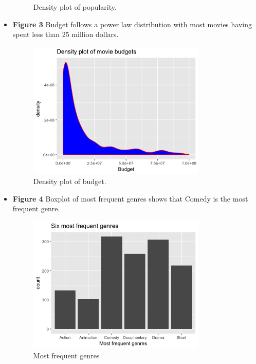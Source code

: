 \documentclass[a4paper]{article}
\begin{document}
\begin{itemize}
\begin{figure}[h]
\begin{center}
		\caption{Density plot of popularity.}
		\label{fig:f2}
		\end{center}
		\end{figure}
		\item \textbf{Figure 3} Budget follows a power law distribution with most movies having spent less than 25 million dollars.
		\begin{figure}[h]
		\begin{center}
		\includegraphics[width=0.8\textwidth]{fig_3_density_budget}
		\caption{Density plot of budget.}
		\label{fig:f3}
		\end{center}
		\end{figure}
		\item \textbf{Figure 4}
		Boxplot of most frequent genres shows that Comedy is the most frequent genre.
		\begin{figure}[h]
		\begin{center}
		\includegraphics[width=0.8\textwidth]{fig_4_boxplot_genres}
		\caption{Most frequent genres}
		\label{fig:f4}
		\end{center}
		\end{figure}
	\end{itemize}
	
\end{document}
